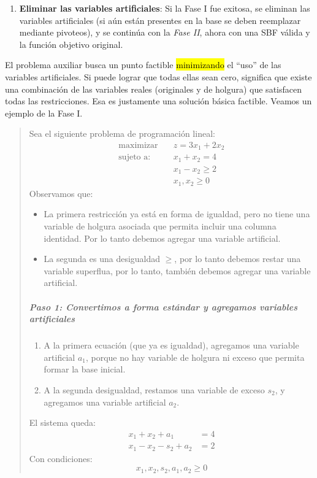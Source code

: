 \begin{enumerate}
  \item \textbf{Eliminar las variables artificiales}: Si la Fase I fue exitosa, se eliminan las variables artificiales (si aún están presentes en la base se deben reemplazar mediante pivoteos), y se continúa con la \textit{Fase II}, ahora con una SBF válida y la función objetivo original.
\end{enumerate}

El problema auxiliar busca un punto factible \hl{minimizando} el ``uso'' de las variables artificiales. Si puede lograr que todas ellas sean cero, significa que existe una combinación de las variables reales (originales y de holgura) que satisfacen todas las restricciones. Esa es justamente una solución básica factible. Veamos un ejemplo de la Fase I.

\begin{quote}
  \ejemplo\label{ej:fase_1} Sea el siguiente problema de programación lineal:
  \begin{align*}
    \text{maximizar} \quad  &z = 3x_1 + 2x_2\\[3pt]
    \text{sujeto a:} \quad  &x_1 + x_2 = 4\\
                            &x_1 - x_2 \geq 2\\
                            &x_1, x_2 \geq 0
  \end{align*}
  Observamos que:
  \begin{itemize}
    \item La primera restricción ya está en forma de igualdad, pero no tiene una variable de holgura asociada que permita incluir una columna identidad. Por lo tanto debemos agregar una variable artificial.
    \item La segunda es una desigualdad \(\geq\), por lo tanto debemos restar una variable superflua, por lo tanto, también debemos agregar una variable artificial.
  \end{itemize}
  
  \subparagraph{Paso 1: Convertimos a forma estándar y agregamos variables artificiales}
  \begin{enumerate}
    \item A la primera ecuación (que ya es igualdad), agregamos una variable artificial \(a_1\), porque no hay variable de holgura ni exceso que permita formar la base inicial.
    \item A la segunda desigualdad, restamos una variable de exceso \(s_2\), y agregamos una variable artificial \(a_2\).
  \end{enumerate}
  El sistema queda:
  \begin{align*}
    x_1 + x_2 + a_1 &= 4\\
    x_1 - x_2 - s_2 + a_2 &= 2
  \end{align*}  
  Con condiciones:
  \[
    x_1, x_2, s_2, a_1, a_2 \geq 0
  \]


\end{quote}
